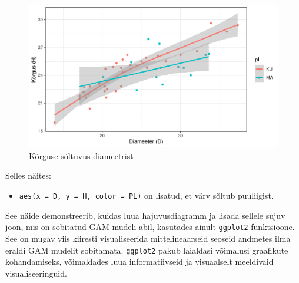 \documentclass[
]{book}
\providecommand{\tightlist}{%
  \setlength{\itemsep}{0pt}\setlength{\parskip}{0pt}}
\theoremstyle{definition}
\theoremstyle{definition}
\theoremstyle{definition}
\theoremstyle{definition}
\theoremstyle{remark}
\begin{document}
\begin{figure}[H]
\includegraphics[width=0.8\linewidth]{_main_files/figure-latex/unnamed-chunk-65-1} \caption{Kõrguse sõltuvus diameetrist}\label{fig:unnamed-chunk-65}
\end{figure}

Selles näites:

\begin{itemize}
\tightlist
\item
  \texttt{aes(x\ =\ D,\ y\ =\ H,\ color\ =\ PL)} on lisatud, et värv sõltub puuliigist.
\end{itemize}

See näide demonstreerib, kuidas luua hajuvusdiagramm ja lisada sellele sujuv joon, mis on sobitatud GAM mudeli abil, kasutades ainult \texttt{ggplot2} funktsioone. See on mugav viis kiiresti visualiseerida mittelineaarseid seoseid andmetes ilma eraldi GAM mudelit sobitamata. \texttt{ggplot2} pakub laialdasi võimalusi graafikute kohandamiseks, võimaldades luua informatiivseid ja visuaalselt meeldivaid visualiseeringuid.


\end{document}
